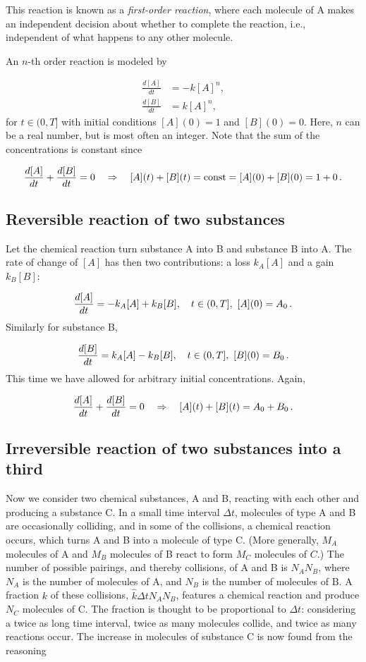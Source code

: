 \documentclass[%
oneside,                 %
final,                   %
10pt]{article}
\begin{document}
This reaction is known as a \emph{first-order reaction}, where each molecule of
A makes an independent decision about whether to complete the reaction,
i.e., independent of what happens to any other molecule.

An $n$-th order reaction is modeled by

\begin{align}
\frac{d[A]}{dt} &= -k[A]^n,\\ 
\frac{d[B]}{dt} &= k[A]^n,
\end{align}
for $t\in (0,T]$ with initial conditions $[A](0) = 1$ and
$[B](0) = 0$. Here, $n$ can be a real number,
but is most often an integer. Note that
the sum of the concentrations is constant since

\[ \frac{d[A]}{dt} + \frac{d[B]}{dt} = 0\quad\Rightarrow\quad
[A](t) + [B](t) = \hbox{const} = [A](0) + [B](0) = 1 + 0\tp\]


\subsection{Reversible reaction of two substances}

Let the chemical reaction turn substance A into B and substance B into A.
The rate of change of $[A]$ has then two contributions: a loss $k_A[A]$
and a gain $k_B[B]$:

\begin{equation}
\frac{d[A]}{dt} = -k_A[A] + k_B[B], \quad t\in (0,T],\ [A](0)=A_0\tp
\end{equation}
Similarly for substance B,

\begin{equation}
\frac{d[B]}{dt} = k_A[A] - k_B[B], \quad t\in (0,T],\ [B](0)=B_0\tp
\end{equation}
This time we have allowed for arbitrary initial concentrations.
Again,

\[ \frac{d[A]}{dt} + \frac{d[B]}{dt} = 0\quad\Rightarrow\quad
[A](t) + [B](t) = A_0+B_0\tp\]

\subsection{Irreversible reaction of two substances into a third}

Now we consider two chemical substances, A and B, reacting with each
other and producing a substance C. In a small time interval $\Delta t$,
molecules of type A and B are occasionally colliding, and in some
of the collisions, a chemical reaction occurs, which turns A and B into
a molecule of type C. (More generally, $M_A$ molecules of A and $M_B$
molecules of B react to form $M_C$ molecules of $C$.)
The number of possible pairings, and thereby collisions, of A and B is
$N_AN_B$, where $N_A$ is the number of molecules of A, and $N_B$ is the
number of molecules of B.
A fraction $k$ of these collisions,
$\hat k\Delta t N_AN_B$, features a chemical reaction and produce
$N_C$ molecules of C. The fraction is thought to be proportional to
$\Delta t$: considering a twice as long time interval, twice as many
molecules collide, and twice as many reactions occur.
The increase in molecules of substance C is now found
from the reasoning
\end{document}
